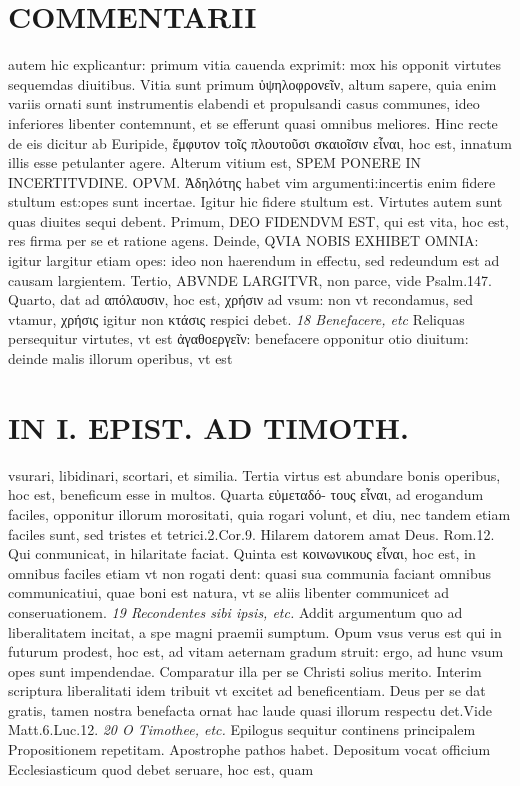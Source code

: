 \documentclass{article}
\begin{document}
\begin{pages}
\section*{COMMENTARII }
\marginpar{[ p.168 ]}\pstart autem hic explicantur: primum vitia cauenda exprimit: mox his opponit virtutes sequemdas diuitibus. Vitia sunt primum ὑψηλοφρονεῖν, altum sapere, quia enim variis ornati sunt instrumentis elabendi et propulsandi casus communes, ideo inferiores libenter contemnunt, et se efferunt quasi omnibus meliores.  \pend\pstart Hinc recte de eis dicitur ab Euripide, ἔμφυτον τοῖς πλουτοῦσι σκαιοῖσιν εἶναι, hoc est, innatum illis esse petulanter agere. Alterum vitium est, SPEM PONERE IN INCERTITVDINE. OPVM. Ἀδηλότης  habet vim argumenti:incertis enim fidere stultum est:opes sunt incertae. Igitur hic fidere stultum est.  \pend\pstart Virtutes autem sunt quas diuites sequi debent. Primum, DEO FIDENDVM EST, qui est vita, hoc est, res firma per se et ratione agens. Deinde, QVIA NOBIS EXHIBET OMNIA: igitur largitur etiam opes: ideo non haerendum in effectu, sed redeundum est ad causam largientem. Tertio, ABVNDE LARGITVR, non parce, vide Psalm.147. Quarto, dat ad απόλαυσιν, hoc est, χρήσιν ad vsum: non vt recondamus, sed vtamur, χρήσις igitur non κτάσις respici debet.  \pend
\textit{18 Benefacere, etc }\pstart Reliquas persequitur virtutes, vt est ἀγαθοεργεῖν: benefacere opponitur otio diuitum: deinde malis illorum operibus, vt est  \pend
\section*{IN I. EPIST. AD TIMOTH. }
\marginpar{[ p.169 ]}\pstart vsurari, libidinari, scortari, et similia. Tertia virtus est abundare bonis operibus, hoc est, beneficum esse in multos. Quarta εὐμεταδό- τους εἶναι, ad erogandum faciles, opponitur illorum morositati, quia rogari volunt, et diu, nec tandem etiam faciles sunt, sed tristes et tetrici.2.Cor.9. Hilarem datorem amat Deus. Rom.12. Qui conmunicat, in hilaritate faciat. Quinta est κοινωνικους εἶναι, hoc est, in omnibus faciles etiam vt non rogati dent: quasi sua communia faciant omnibus communicatiui, quae boni est natura, vt se aliis libenter communicet ad conseruationem.  \pend
\textit{19 Recondentes sibi ipsis, etc. }\pstart Addit argumentum quo ad liberalitatem incitat, a spe magni praemii sumptum. Opum vsus verus est qui in futurum prodest, hoc est, ad vitam aeternam gradum struit: ergo, ad hunc vsum opes sunt impendendae. Comparatur illa per se Christi solius merito. Interim scriptura liberalitati idem tribuit vt excitet ad beneficentiam. Deus per se dat gratis, tamen nostra benefacta ornat hac laude quasi illorum respectu det.Vide Matt.6.Luc.12.  \pend
\textit{20 O Timothee, etc. }\pstart Epilogus sequitur continens principalem Propositionem repetitam. Apostrophe pathos habet. Depositum vocat officium Ecclesiasticum quod debet seruare, hoc est, quam  \pend

\end{pages}
\end{document}
